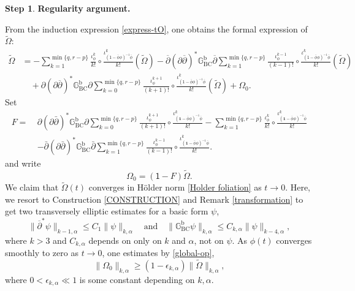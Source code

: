 \documentclass[12pt]{amsart}
\numberwithin{equation}{section}
\theoremstyle{definition}
\newtheorem{step}{Step}
\theoremstyle{definition}
\theoremstyle{definition}
\renewcommand{\1}{\mathsf{1}}
\newcommand{\G}{\mathbb{G}}
\newcommand{\db}{\overline{\partial}}
\newcommand{\Om}{\Omega}
\renewcommand{\>}{\rightarrow}
\newcommand{\p}{\partial}
\def\p{\partial}
\def\b{\bar}
\theoremstyle{plain} %
\theoremstyle{plain} %
\theoremstyle{plain} %
\begin{document}
	
	\begin{step}\label{foliation step 4}
		{\rm\textbf{Regularity argument.}}\end{step}
	From the induction expression \eqref{express-tO}, one obtains the formal expression of $\widetilde{\Omega}:$
	\begin{equation}\label{omexp}
		\begin{aligned}
			\widetilde{\Omega}&=-\sum_{k=1}^{\min\{q,r-p\}}\frac{ {\iota}^{k}_{ \phi}}{k!}\circ\frac{ {\iota}^{k}_{(\1-\b{ \phi} \phi)^{-1}\b{ \phi}}}{k!}(\widetilde{\Omega})
			-\db(\p\db)^*\G_{\mathrm {BC}}^\mathrm b\db\sum_{k=1}^{\min\{q,r-p\}}\frac{ {\iota}^{k-1}_{ \phi}}{(k-1)!}\circ\frac{ {\iota}^{k}_{(\1-\b{ \phi} \phi)^{-1}\b{ \phi}}}{k!}(\widetilde{\Omega})\\
			&\quad +\p(\p\db)^*\G_{\mathrm {BC}}^\mathrm b\p\sum_{k=0}^{\min\{q,r-p\}} \frac{ {\iota}^{k+1}_{ \phi}}{(k+1)!}\circ\frac{ {\iota}^{k}_{(\1-\b{ \phi} \phi)^{-1}\b{ \phi}}}{k!}(\widetilde{\Omega})
			+\Om_0.
		\end{aligned}
	\end{equation}
	Set
\[
\begin{aligned}
	F =\ & \partial(\partial\bar{\partial})^* \mathbb{G}_{\mathrm{BC}}^{\mathrm{b}} \partial \sum_{k=0}^{\min\{q,r-p\}} \frac{\iota_{\phi}^{k+1}}{(k+1)!} \circ \frac{\iota_{(\mathbf{1} - \bar{\phi} \phi)^{-1} \bar{\phi}}^k}{k!}
	- \sum_{k=1}^{\min\{q,r-p\}} \frac{\iota_{\phi}^k}{k!} \circ \frac{\iota_{(\mathbf{1} - \bar{\phi} \phi)^{-1} \bar{\phi}}^k}{k!} \\
	& - \bar{\partial}(\partial\bar{\partial})^* \mathbb{G}_{\mathrm{BC}}^{\mathrm{b}} \bar{\partial} \sum_{k=1}^{\min\{q,r-p\}} \frac{\iota_{\phi}^{k-1}}{(k-1)!} \circ \frac{\iota_{(\mathbf{1} - \bar{\phi} \phi)^{-1} \bar{\phi}}^k}{k!}.
\end{aligned}
\]
	and write
	\begin{equation}\label{global-op}
		\Om_0=(\1-F)\widetilde{\Omega}.
	\end{equation}
	We claim that $\widetilde{\Omega}(t)$ converges in H\"older norm \eqref{Holder foliation} as $t\rightarrow 0$. Here, we resort to  Construction \ref{CONSTRUCTION} and Remark \ref{transformation} to get two transversely elliptic estimates for a basic form $\psi$,
	$$
	\|\overline{\partial}^*\psi\|_{k-1, \alpha}\leq C_1\|\psi\|_{k,
		\alpha}\quad\text{and}\quad
	\|\G_{\mathrm {BC}}^\mathrm b\psi\|_{k, \alpha}\leq C_{k,\alpha}\|\psi\|_{k-4, \alpha},
	$$
	where $k>3$ and $C_{k,\alpha}$ depends on only on $k$ and $\alpha$,
	not on $\psi$. As $ \phi(t)$ converges smoothly to zero as $t\rightarrow 0$,
	one estimates  by \eqref{global-op},
	\begin{equation*}\label{estimate-omeg}
		\| \Om_0\|_{k, \alpha}\geq
		(1-\epsilon_{k,\alpha})
		\|\widetilde{\Omega} \|_{k, \alpha},
	\end{equation*}
	where $0<\epsilon_{k,\alpha}\ll 1$ is some constant depending on $k,\alpha$.
	
\end{document}
